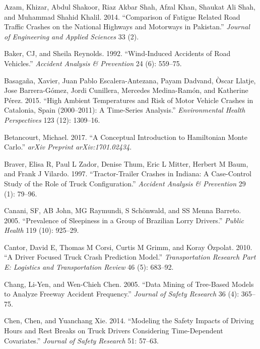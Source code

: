 \documentclass[12pt]{book}
\numberwithin{equation}{chapter}
\begin{document}
\leavevmode\hypertarget{ref-azam2014comparison}{}%
Azam, Khizar, Abdul Shakoor, Riaz Akbar Shah, Afzal Khan, Shaukat Ali Shah, and Muhammad Shahid Khalil. 2014. ``Comparison of Fatigue Related Road Traffic Crashes on the National Highways and Motorways in Pakistan.'' \emph{Journal of Engineering and Applied Sciences} 33 (2).

\leavevmode\hypertarget{ref-baker1992wind}{}%
Baker, CJ, and Sheila Reynolds. 1992. ``Wind-Induced Accidents of Road Vehicles.'' \emph{Accident Analysis \& Prevention} 24 (6): 559--75.

\leavevmode\hypertarget{ref-basagana2015high}{}%
Basagaña, Xavier, Juan Pablo Escalera-Antezana, Payam Dadvand, Òscar Llatje, Jose Barrera-Gómez, Jordi Cunillera, Mercedes Medina-Ramón, and Katherine Pérez. 2015. ``High Ambient Temperatures and Risk of Motor Vehicle Crashes in Catalonia, Spain (2000--2011): A Time-Series Analysis.'' \emph{Environmental Health Perspectives} 123 (12): 1309--16.

\leavevmode\hypertarget{ref-betancourt2017conceptual}{}%
Betancourt, Michael. 2017. ``A Conceptual Introduction to Hamiltonian Monte Carlo.'' \emph{arXiv Preprint arXiv:1701.02434}.

\leavevmode\hypertarget{ref-braver1997tractor}{}%
Braver, Elisa R, Paul L Zador, Denise Thum, Eric L Mitter, Herbert M Baum, and Frank J Vilardo. 1997. ``Tractor-Trailer Crashes in Indiana: A Case-Control Study of the Role of Truck Configuration.'' \emph{Accident Analysis \& Prevention} 29 (1): 79--96.

\leavevmode\hypertarget{ref-canani2005prevalence}{}%
Canani, SF, AB John, MG Raymundi, S Schönwald, and SS Menna Barreto. 2005. ``Prevalence of Sleepiness in a Group of Brazilian Lorry Drivers.'' \emph{Public Health} 119 (10): 925--29.

\leavevmode\hypertarget{ref-cantor2010driver}{}%
Cantor, David E, Thomas M Corsi, Curtis M Grimm, and Koray Özpolat. 2010. ``A Driver Focused Truck Crash Prediction Model.'' \emph{Transportation Research Part E: Logistics and Transportation Review} 46 (5): 683--92.

\leavevmode\hypertarget{ref-chang2005data}{}%
Chang, Li-Yen, and Wen-Chieh Chen. 2005. ``Data Mining of Tree-Based Models to Analyze Freeway Accident Frequency.'' \emph{Journal of Safety Research} 36 (4): 365--75.

\leavevmode\hypertarget{ref-chen2014modeling}{}%
Chen, Chen, and Yuanchang Xie. 2014. ``Modeling the Safety Impacts of Driving Hours and Rest Breaks on Truck Drivers Considering Time-Dependent Covariates.'' \emph{Journal of Safety Research} 51: 57--63.
\end{document}
